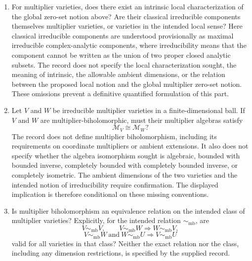 \documentclass[11pt]{article}
\begin{document}
\begin{enumerate}
\item For multiplier varieties, does there exist an intrinsic local characterization of the global zero-set notion above? Are their classical irreducible components themselves multiplier varieties, or varieties in the intended local sense? Here classical irreducible components are understood provisionally as maximal irreducible complex-analytic components, where irreducibility means that the component cannot be written as the union of two proper closed analytic subsets. The record does not specify the local characterization sought, the meaning of intrinsic, the allowable ambient dimensions, or the relation between the proposed local notion and the global multiplier zero-set notion. These omissions prevent a definitive quantified formulation of this part.

\item Let \(V\) and \(W\) be irreducible multiplier varieties in a finite-dimensional ball. If \(V\) and \(W\) are multiplier-biholomorphic, must their multiplier algebras satisfy
\[
 \mathcal M_V\cong\mathcal M_W?
\]
The record does not define multiplier biholomorphism, including its requirements on coordinate multipliers or ambient extensions. It also does not specify whether the algebra isomorphism sought is algebraic, bounded with bounded inverse, completely bounded with completely bounded inverse, or completely isometric. The ambient dimensions of the two varieties and the intended notion of irreducibility require confirmation. The displayed implication is therefore conditional on these missing conventions.

\item Is multiplier biholomorphism an equivalence relation on the intended class of multiplier varieties? Explicitly, for the intended relation \(\sim_{\mathrm{mb}}\), are
\[
 V\sim_{\mathrm{mb}}V,\qquad
 V\sim_{\mathrm{mb}}W\Longrightarrow W\sim_{\mathrm{mb}}V,
\]
\[
 V\sim_{\mathrm{mb}}W\ \text{and}\ W\sim_{\mathrm{mb}}U
 \Longrightarrow V\sim_{\mathrm{mb}}U
\]
valid for all varieties in that class? Neither the exact relation nor the class, including any dimension restrictions, is specified by the supplied record.


\end{enumerate}
\end{document}
